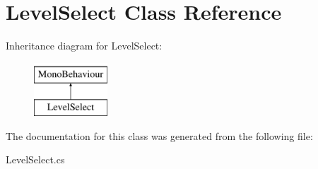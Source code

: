 \hypertarget{class_level_select}{}\section{Level\+Select Class Reference}
\label{class_level_select}
Inheritance diagram for Level\+Select\+:\begin{figure}[H]
\begin{center}
\leavevmode
\includegraphics[height=2.000000cm]{class_level_select}
\end{center}
\end{figure}


The documentation for this class was generated from the following file\+:\begin{DoxyCompactItemize}
\item 
Level\+Select.\+cs\end{DoxyCompactItemize}

